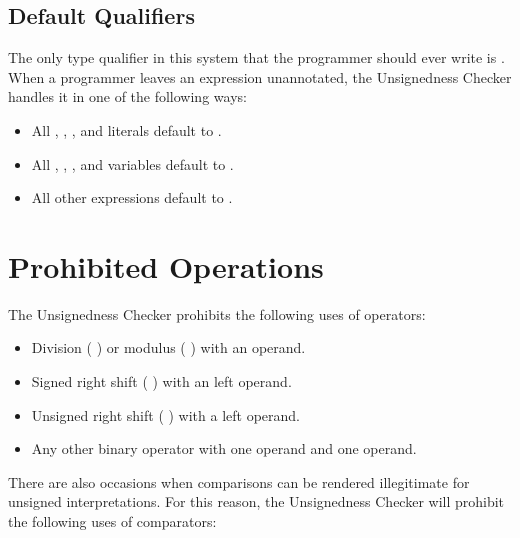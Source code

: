 \subsection{Default Qualifiers\label{unsignedness-checker-annotations-default-qualifiers}}

The only type qualifier in this system that the programmer should ever write is
. When a programmer leaves an expression unannotated, the
Unsignedness Checker handles it in one of the following ways:

\begin{itemize}

    \item
    All , , , and  literals default
    to .
    \item
    All , , , and  variables default
    to .
    \item
    All other expressions default to .

\end{itemize}

\section{Prohibited Operations\label{unsignedness-checker-Prohibited-Operations}}

The Unsignedness Checker prohibits the following uses of operators:

\begin{itemize}

    \item   
    Division ( \code{/} ) or modulus ( \code{\%} ) with an 
    operand.
    \item   
    Signed right shift ( \code{\>\>} ) with an  left operand.
    \item   
    Unsigned right shift ( \code{\>\>\>} ) with a  left operand.
    \item   
    Any other binary operator with one  operand and one
     operand.

\end{itemize}

There are also occasions when comparisons can be rendered illegitimate for
unsigned interpretations. For this reason, the Unsignedness Checker will prohibit the following uses of comparators:

